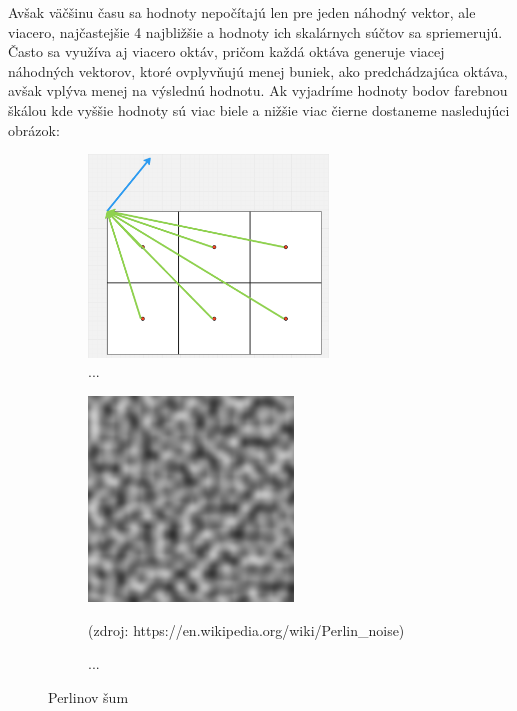 \documentclass[12pt]{article}
\begin{document}
Avšak väčšinu času sa hodnoty nepočítajú len pre jeden náhodný vektor,
ale viacero, najčastejšie 4 najbližšie a hodnoty ich skalárnych súčtov
sa spriemerujú. Často sa využíva aj viacero oktáv, pričom každá oktáva generuje
viacej náhodných vektorov, ktoré ovplyvňujú menej buniek, ako predchádzajúca
oktáva, avšak vplýva menej na výslednú hodnotu. Ak vyjadríme hodnoty bodov
farebnou škálou kde vyššie hodnoty sú viac biele a nižšie viac čierne dostaneme
nasledujúci obrázok:

\begin{figure}[h]
	\centering

	\begin{subfigure}[t]{0.49\textwidth}
		\centering
		\includegraphics[width=0.7\textwidth]{res/prelinov_sum.png}
		\caption{...}
		\label{obr:perlinov sum}
	\end{subfigure}
	\hfill
	\begin{subfigure}[t]{0.49\textwidth}
		\centering
		\includegraphics[width=0.6\textwidth]{res/perlinov_sum_textura.png}
		\caption{...}
		\footnotesize (zdroj: https://en.wikipedia.org/wiki/Perlin\_noise)
		\label{obr:perlinov sum textura}
	\end{subfigure}

	\caption{Perlinov šum}
\end{figure}
\end{document}
